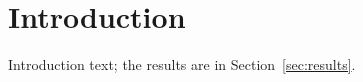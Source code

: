 \section{Introduction}
\label{sec:introduction}

Introduction text; the results are in Section~\ref{sec:results}.

